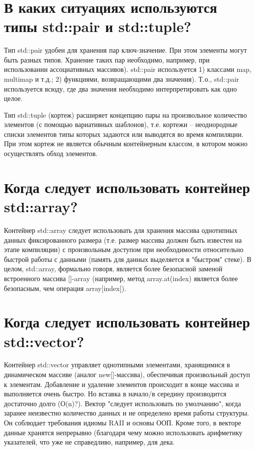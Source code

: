 \documentclass[a4paper,12pt]{article}	%
\title{
	\center{\textbf{Контрольные вопросы. Задание 14.}}
	}
\begin{document}

\maketitle

\section{В каких ситуациях используются типы std::pair и std::tuple?}

	Тип std::pair удобен для хранения пар ключ-значение. При этом элементы могут быть разных типов. Хранение таких пар необходимо, например, при использовании ассоциативных массивов). std::pair используется 1) классами map, multimap и т.д.; 2) функциями, возвращающими два значения). Т.о., std::pair используется всюду, где два значения необходимо интерпретировать как одно целое.
	
	Тип std::tuple (кортеж) расширяет концепцию пары на произвольное количество элементов (с помощью вариативных шаблонов), т.е. кортежи -- неоднородные списки элементов типы которых задаются или выводятся во время компиляции. При этом кортеж не является обычным контейнерным классом, в котором можно осуществлять обход элементов.

\section{Когда следует использовать контейнер std::array?}

	Контейнер std::array следует использовать для хранения массива однотипных данных фиксированного размера (т.е. размер массива должен быть известен на этапе компиляции) с произвольным доступом при необходимости относительно быстрой работы с данными (память для данных выделяется в "быстром" стеке). В целом, std::array, формально говоря, является более безопасной заменой встроенного массива []-array (например, метод array.at(index) является более безопасным, чем операция array[index]).

\section{Когда следует использовать контейнер std::vector?}

	Контейнер std::vector управляет однотипными элементами, хранящимися в динамическом массиве (аналог new[]-массива), обеспечивая произвольный доступ к элементам. Добавление и удаление элементов происходит в конце массива и выполняется очень быстро. Но вставка в начало/в середину производится достаточно долго (О(n)?). Вектор "следует использовать по умолчанию", когда заранее неизвестно количество данных и не определено время работы структуры. Он соблюдает требования идиомы RAII и основы ООП. Кроме того, в векторе данные хранятся непрерывно (благодаря чему можно использовать арифметику указателей, что уже не справедливо, например, для дека.
\end{document}
